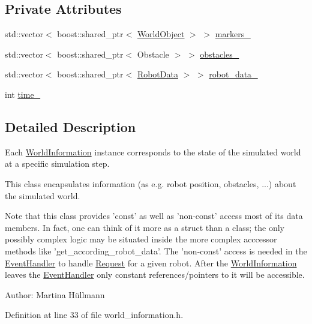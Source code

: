 \subsection*{Private Attributes}
\begin{CompactItemize}
\item 
std::vector$<$ boost::shared\_\-ptr$<$ \hyperlink{class_world_object}{WorldObject} $>$ $>$ \hyperlink{class_world_information_d6fdbbedac7073bf4ae6ca86594e6853}{markers\_\-}
\item 
std::vector$<$ boost::shared\_\-ptr$<$ Obstacle $>$ $>$ \hyperlink{class_world_information_0c5a0ac3fe3570a87495d5dd8c925e27}{obstacles\_\-}
\item 
std::vector$<$ boost::shared\_\-ptr$<$ \hyperlink{class_robot_data}{RobotData} $>$ $>$ \hyperlink{class_world_information_118f01f046eda522ff0b86bc3d5a712d}{robot\_\-data\_\-}
\item 
int \hyperlink{class_world_information_540835d7e7a2311dd77a405655f0bdb4}{time\_\-}
\end{CompactItemize}


\subsection{Detailed Description}
Each \hyperlink{class_world_information}{WorldInformation} instance corresponds to the state of the simulated world at a specific simulation step. 

This class encapsulates information (as e.g. robot position, obstacles, ...) about the simulated world.

Note that this class provides 'const' as well as 'non-const' access most of its data members. In fact, one can think of it more as a struct than a class; the only possibly complex logic may be situated inside the more complex acccessor methods like 'get\_\-according\_\-robot\_\-data'. The 'non-const' access is needed in the \hyperlink{class_event_handler}{EventHandler} to handle \hyperlink{class_request}{Request} for a given robot. After the \hyperlink{class_world_information}{WorldInformation} leaves the \hyperlink{class_event_handler}{EventHandler} only constant references/pointers to it will be accessible.

\begin{Desc}
\item[Author:]Martina Hüllmann \end{Desc}


Definition at line 33 of file world\_\-information.h.


